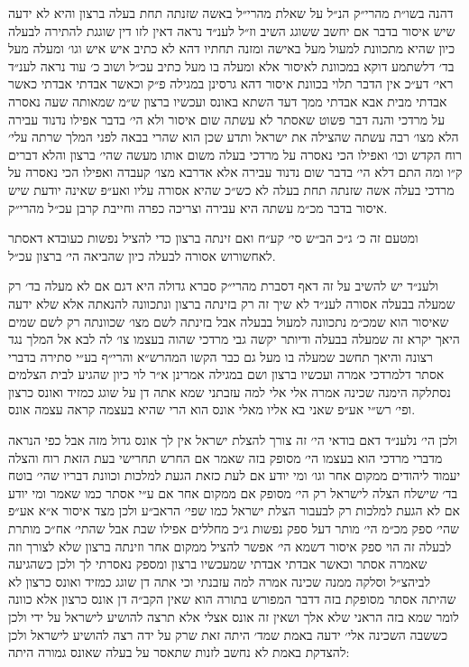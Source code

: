 \documentclass[12pt, openany]{book}
\begin{document}
\begin{multicols}{2}
דהנה בשו״ת מהרי״ק הנ״ל על שאלת מהרי״ל באשה שזנתה תחת בעלה ברצון והיא לא ידעה שיש איסור בדבר אם יחשב ששוגג השיב וז״ל לענ״ד נראה דאין לזו דין שוגגת להתירה לבעלה כיון שהיא מתכוונת למעול מעל באישה ומזנה תחתיו דהא לא כתיב איש איש וגו׳ ומעלה מעל בד׳ דלשתמע דוקא במכוונת לאיסור אלא ומעלה בו מעל כתיב עכ״ל ושוב כ׳ עוד נראה לענ״ד ראי׳ דע״כ אין הדבר תלוי בכוונת איסור דהא גרסינן במגילה פ״ק וכאשר אבדתי אבדתי כאשר אבדתי מבית אבא אבדתי ממך דעד השתא באונס ועכשיו ברצון ש״מ שמאותה שעה נאסרה על מרדכי והנה דבר פשוט שאסתר לא עשתה שום איסור ולא הי׳ בדבר אפילו נדנוד עבירה הלא מצו׳ רבה עשתה שהצילה את ישראל ותדע שכן הוא שהרי בבאה לפני המלך שרתה עלי׳ רוח הקדש וכו׳ ואפילו הכי נאסרה על מרדכי בעלה משום אותו מעשה שהי׳ ברצון והלא דברים ק״ו ומה התם דלא הי׳ בדבר שום נדנוד עבירה אלא אדרבא מצו׳ קעבדה ואפילו הכי נאסרה על מרדכי בעלה אשה שזנתה תחת בעלה לא כש״כ שהיא אסורה עליו ואע״פ שאינה יודעת שיש איסור בדבר מכ״מ עשתה היא עבירה וצריכה כפרה וחייבת קרבן עכ״ל מהרי״ק.\\\vspace{0pt}

ומטעם זה כ׳ ג״כ הב״ש סי׳ קע״ח ואם זינתה ברצון כדי להציל נפשות כעובדא דאסתר לאחשורוש אסורה לבעלה כיון שהביאה הי׳ ברצון עכ״ל.\\\vspace{0pt}

ולענ״ד יש להשיב על זה דאף דסברת מהרי״ק סברא גדולה היא דגם אם לא מעלה בד׳ רק שמעלה בבעלה אסורה לענ״ד לא שיך זה רק בזינתה ברצון ונתכוונה להנאתה אלא שלא ידעה שאיסור הוא שמכ״מ נתכוונה למעול בבעלה אבל בזינתה לשם מצו׳ שכוונתה רק לשם שמים היאך יקרא זה שמעלה בבעלה ודיותר יקשה גבי מרדכי שהוה בעצמו צו׳ לה לבא אל המלך נגד רצונה והיאך תחשב שמעלה בו מעל גם כבר הקשו המהרש״א והרי״ף בע״י סתירה בדברי אסתר דלמרדכי אמרה ועכשיו ברצון ושם במגילה אמרינן א״ר לוי כיון שהגיע לבית הצלמים נסתלקה הימנה שכינה אמרה אלי אלי למה עזבתני שמא אתה דן על שוגג כמזיד ואונס כרצון ופי׳ רש״י אע״פ שאני בא אליו מאלי אונס הוא הרי שהיא בעצמה קראה עצמה אונס.\\\vspace{0pt}

ולכן הי׳ נלענ״ד דאם בודאי הי׳ זה צורך להצלת ישראל אין לך אונס גדול מזה אבל כפי הנראה מדברי מרדכי הוא בעצמו הי׳ מסופק בזה שאמר אם החרש תחרישי בעת הזאת רוח והצלה יעמוד ליהודים ממקום אחר וגו׳ ומי יודע אם לעת כזאת הגעת למלכות וכוונת דבריו שהי׳ בוטח בד׳ שישלח הצלה לישראל רק הי׳ מסופק אם ממקום אחר אם ע״י אסתר כמו שאמר ומי יודע אם לא הגעת למלכות רק לבעבור הצלת ישראל כמו שפי׳ הראב״ע ולכן מצד איסור א״א אע״פ שהי׳ ספק מכ״מ הי׳ מותר דעל ספק נפשות ג״כ מחללים אפילו שבת אבל שהתי׳ אח״כ מותרת לבעלה זה הוי ספק איסור דשמא הי׳ אפשר להציל ממקום אחר וזינתה ברצון שלא לצורך וזה שאמרה אסתר וכאשר אבדתי אבדתי שמעכשיו ברצון ומספק נאסרתי לך ולכן כשהגיעה לביהצ״ל וסלקה ממנה שכינה אמרה למה עזבנתי וכי אתה דן שוגג כמזיד ואונס כרצון לא שהיתה אסתר מסופקת בזה דדבר המפורש בתורה הוא שאין הקב״ה דן אונס כרצון אלא כוונה לומר שמא בזה הראני שלא אלך ושאין זה אונס אצלי אלא תרצה להושיע לישראל על ידי ולכן כששבה השכינה אלי׳ ידעה באמת שמד׳ היתה זאת שרק על ידה רצה להושיע לישראל ולכן להצדקת באמת לא נחשב לזנות שתאסר על בעלה שאונס גמורה היתה:\\\vspace{0pt}


\end{multicols}
\end{document}

